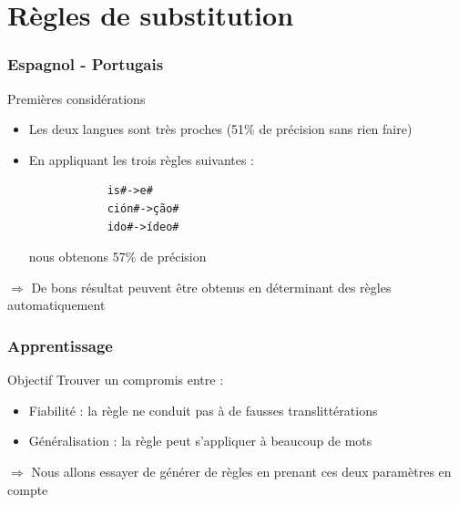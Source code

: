 \documentclass{beamer}
\begin{document}
\section{Règles de substitution}
\begin{frame}
\tableofcontents[currentsection]
\end{frame}
\begin{frame}[fragile]
	\frametitle{Espagnol - Portugais}

	\begin{block}{Premières considérations}
		\begin{itemize}
		\item Les deux langues sont très proches (51\% de précision sans rien faire)
		\item En appliquant les trois règles suivantes : {\scriptsize \begin{verbatim}
			is#->e#
			ción#->ção#
			ido#->ídeo#
			\end{verbatim}}
			nous obtenons 57\% de précision
		\end{itemize}
	\end{block}

	\begin{alertblock}{}
	$\Longrightarrow$ De bons résultat peuvent être obtenus en déterminant des règles automatiquement 
	\end{alertblock}
\end{frame}

\begin{frame}
	\frametitle{Apprentissage}

	\begin{block}{Objectif}
	Trouver un compromis entre :
		\begin{itemize}
		\item Fiabilité : la règle ne conduit pas à de fausses translittérations
		\item Généralisation : la règle peut s'appliquer à beaucoup de mots
		\end{itemize}			
	\end{block}

	\begin{alertblock}{}
	$\Longrightarrow$ Nous allons essayer de générer de règles en prenant ces deux paramètres en compte
	\end{alertblock}
\end{frame}
\end{document}

